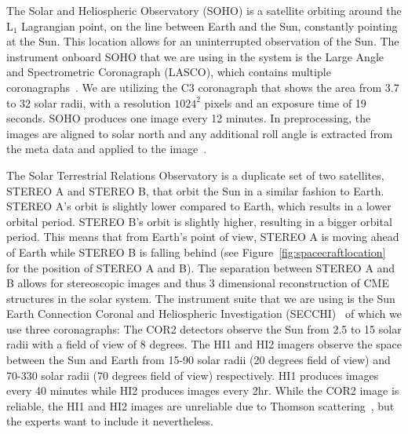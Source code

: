 \documentclass[journal]{vgtc}                %
\begin{document}
 The Solar and Heliospheric Observatory (SOHO) is a satellite orbiting around the L$_1$ Lagrangian point, on the line between Earth and the Sun, constantly pointing at the Sun. This location allows for an uninterrupted observation of the Sun. The instrument onboard SOHO that we are using in the system is the Large Angle and Spectrometric Coronagraph (LASCO), which contains multiple coronagraphs~\cite{Brueckner:1995cb}. We are utilizing the C3 coronagraph that shows the area from 3.7 to 32 solar radii, with a resolution $1024^2$ pixels and an exposure time of 19 seconds. SOHO produces one image every 12 minutes. In preprocessing, the images are aligned to solar north and any additional roll angle is extracted from the meta data and applied to the image~\cite{wells1981fits}.

 The Solar Terrestrial Relations Observatory is a duplicate set of two satellites, STEREO A and STEREO B, that orbit the Sun in a similar fashion to Earth. STEREO A's orbit is slightly lower compared to Earth, which results in a lower orbital period. STEREO B's orbit is slightly higher, resulting in a bigger orbital period. This means that from Earth's point of view, STEREO A is moving ahead of Earth while STEREO B is falling behind (see Figure~\ref{fig:spacecraftlocation} for the position of STEREO A and B). The separation between STEREO A and B allows for stereoscopic images and thus 3 dimensional reconstruction of CME structures in the solar system. The instrument suite that we are using is the Sun Earth Connection Coronal and Heliospheric Investigation (SECCHI)~\cite{Socker:2000ic} of which we use three coronagraphs: The COR2 detectors observe the Sun from 2.5 to 15 solar radii with a field of view of 8 degrees. The  HI1 and HI2 imagers observe the space between the Sun and Earth from 15-90 solar radii (20 degrees field of view) and 70-330 solar radii (70 degrees field of view) respectively. HI1 produces images every 40 minutes while HI2 produces images every 2hr. While the COR2 image is reliable, the HI1 and HI2 images are unreliable due to Thomson scattering~\cite{howard2012thomson}, but the experts want to include it nevertheless.
\end{document}
